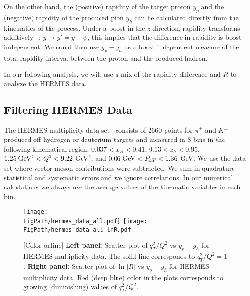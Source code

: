 \documentclass[final,3p,times,onecolumn,sort&compress,hidelinks]{elsarticle}
\newcommand{\xbj}{x_B}
\newcommand*{\FigPath}{../Figs/}%
\begin{document}
On the other hand, the (positive) rapidity of the target proton $y_p$ and the (negative) rapidity of the produced pion $y_h$ can be calculated directly from the kinematics of the process. 
 Under a boost in the  $z$ direction, rapidity transforms additively ~\cite{Collins:2011zzd}: $y \to y' = y+\psi$, this implies that the difference in rapidity is boost independent.
We could then use $y_p - y_h$ as a boost independent measure of the total rapidity interval between the proton and the produced hadron.

In our following analysis, we will use a mix of the rapidity difference and $R$ to analyze the HERMES data.

\subsection{Filtering HERMES Data} 

The HERMES multiplicity data set~\cite{Airapetian:2012ki} consists of 2660 points for $\pi^\pm$ and $K^\pm$ produced off hydrogen or deuterium targets and measured in 8 bins in the following kinematical region: $0.037 < \xbj < 0.41$, $0.13 < z_h < 0.95$, $1.25\; {\rm GeV^2} < Q^2 < 9.22$ GeV$^2$,  and $0.06 \; {\rm GeV} < P_{hT} < 1.36$ GeV. We use the data set where vector meson contributions were subtracted. We sum in quadrature statistical and systematic errors and we ignore correlations. In our numerical calculations we always use the average values of the kinematic variables in each bin.
\begin{figure}[htb!]
\centering
\texttt{[image: \\FigPath/hermes\_data\_all.pdf]}
\texttt{[image: \\FigPath/hermes\_data\_all\_lnR.pdf]}
\caption{\label{Fig:hermes_data_rapidity}
[Color online]  {\bf Left panel:} Scatter plot of $q_T^2/Q^2$ vs $y_p-y_h$ for HERMES multiplicity data.  The solid line corresponds to $q_T^2/Q^2=1$. {\bf Right panel:} Scatter plot of $\ln|R|$  vs $y_p-y_h$ for HERMES multiplicity data. Red (deep blue) color in the plots corresponds to growing (diminishing) values of $q_T^2/Q^2$.
}
\end{figure}
\end{document}
